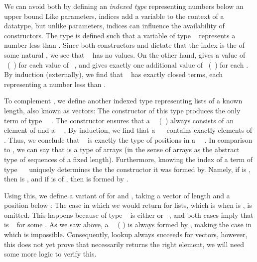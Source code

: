 We can avoid both by defining an \emph{indexed type} representing numbers below an upper bound
Like parameters, indices add a variable to the context of a datatype, but unlike parameters, indices can influence the availability of constructors. The type  is defined such that a variable of type \  represents a number less than . Since both constructors  and  dictate that the index is the  of some natural , we see that \  has no values. On the other hand,  gives a value of \ (\ ) for each value of \ , and  gives exactly one additional value of \ (\ ) for each . By induction (externally), we find that \  has exactly  closed terms, each representing a number less than .

To complement , we define another indexed type representing lists of a known length, also known as vectors:
The \AIC{[]} constructor of this type produces the only term of type \ \ . The  constructor ensures that a \ \ (\ ) always consists of an element of  and a \ \ . By induction, we find that a \ \  contains exactly  elements of . Thus, we conclude that \  is exactly the type of positions in a \ \ . In comparison to , we can say that  is a type of arrays (in the sense of arrays as the abstract type of sequences of a fixed length). Furthermore, knowing the index of a term  of type \ \  uniquely determines the the constructor it was formed by. Namely, if  is , then  is \AIC{[]}, and if  is  of , then  is formed by . 

Using this, we define a variant of  for  and , taking a vector of length  and a position below :
The case in which we would return  for lists, which is when  is \AIC{[]}, is omitted. This happens because  of type \  is either  or \ , and both cases imply that  is \  for some . As we saw above, a \ \ ( ) is always formed by , making the case in which  is \AIC{[]} impossible. Consequently, lookup always succeeds for vectors,
however, this does not yet prove that  necessarily returns the right element, we will need some more logic to verify this.

